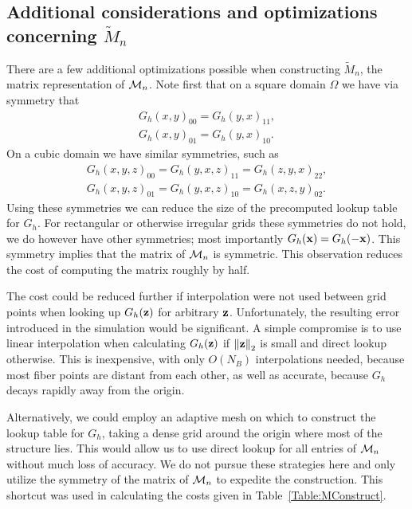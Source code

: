 \subsection{Additional considerations and optimizations concerning $\tilde{M}_n$}
There are a few additional optimizations possible when constructing $\tilde{M}_n$, the matrix representation of $\mathcal{M}_n$.
Note first that on a square domain $\Omega$ we have via symmetry that
\begin{gather}
G_h(x,y)_{00} = G_h(y,x)_{11}, \\
G_h(x,y)_{01} = G_h(y,x)_{10}.
\end{gather}
On a cubic domain we have similar symmetries, such as 
\begin{gather}
G_h(x,y,z)_{00} = G_h(y,x,z)_{11} = G_h(z,y,x)_{22}, \\
G_h(x,y,z)_{01} = G_h(y,x,z)_{10} = G_h(x,z,y)_{02}.
\end{gather}
Using these symmetries we can reduce the size of the precomputed lookup table for $G_h$.
For rectangular or otherwise irregular grids these symmetries do not hold, we do however have other symmetries; most importantly $G_h(\mathbf{x}) = G_h(-\mathbf{x})$.
This symmetry implies that the matrix of $\mathcal{M}_n$ is symmetric. This observation reduces the cost of computing the matrix roughly by half.

The cost could be reduced further if interpolation were not used between grid points when looking up $G_h(\mathbf{z})$ for arbitrary $\mathbf{z}$. Unfortunately, the resulting error introduced in the simulation would be significant. A simple compromise is to use linear interpolation when calculating $G_h(\mathbf{z})$ if $\left\lVert\mathbf{z}\right\rVert_2$ is small and direct lookup otherwise. This is inexpensive, with only $O(N_B)$ interpolations needed, because most fiber points are distant from each other, as well as accurate, because $G_h$ decays rapidly away from the origin. 

Alternatively, we could employ an adaptive mesh on which to construct the lookup table for $G_h$, taking a dense grid around the origin where most of the structure lies. This would allow us to use direct lookup for all entries of $\mathcal{M}_n$ without much loss of accuracy. We do not pursue these strategies here and only utilize the symmetry of the matrix of $\mathcal{M}_n$ to expedite the construction. This shortcut was used in calculating the costs given in Table~\ref{Table:MConstruct}.






